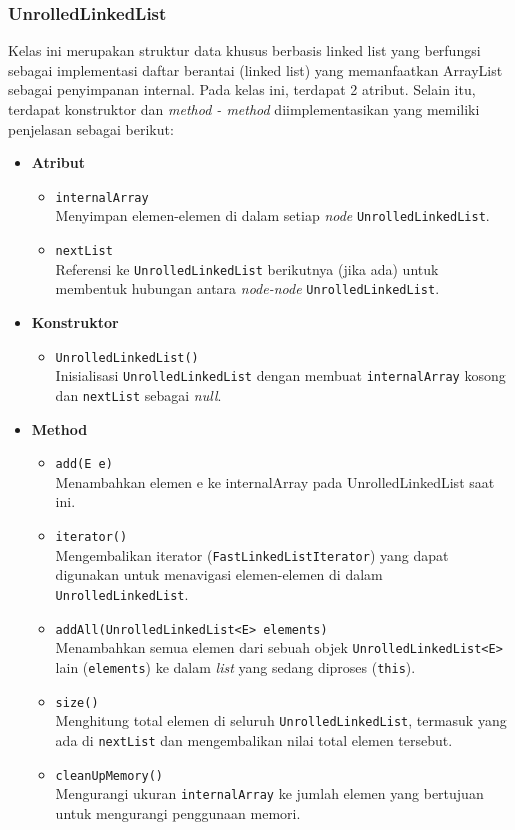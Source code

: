 \subsubsection{UnrolledLinkedList}
Kelas ini merupakan struktur data khusus berbasis linked list yang berfungsi sebagai implementasi daftar berantai (linked list) yang memanfaatkan ArrayList sebagai penyimpanan internal. Pada kelas ini, terdapat 2 atribut. Selain itu, terdapat konstruktor dan \textit{method - method} diimplementasikan yang memiliki penjelasan sebagai berikut:
\begin{itemize}
    \item \textbf{Atribut}
    \begin{itemize}
        \item \texttt{internalArray}
        \\ Menyimpan elemen-elemen di dalam setiap \textit{node} \texttt{UnrolledLinkedList}.
        \item \texttt{nextList}
        \\ Referensi ke \texttt{UnrolledLinkedList} berikutnya (jika ada) untuk membentuk hubungan antara \textit{node-node} \texttt{UnrolledLinkedList}.
    \end{itemize}

    \item \textbf{Konstruktor}
    \begin{itemize}
        \item \texttt{UnrolledLinkedList()}
        \\ Inisialisasi \texttt{UnrolledLinkedList} dengan membuat \texttt{internalArray} kosong dan \texttt{nextList} sebagai \textit{null}.
    \end{itemize}

    \item \textbf{Method}
    \begin{itemize}
        \item \texttt{add(E e)}
        \\Menambahkan elemen e ke internalArray pada UnrolledLinkedList saat ini.

        \item \texttt{iterator()}
        \\Mengembalikan iterator (\texttt{FastLinkedListIterator}) yang dapat digunakan untuk menavigasi elemen-elemen di dalam \texttt{UnrolledLinkedList}.
        \item \texttt{addAll(UnrolledLinkedList<E> elements)}
        \\ Menambahkan semua elemen dari sebuah objek \texttt{UnrolledLinkedList<E>} lain (\texttt{elements}) ke dalam \textit{list} yang sedang diproses (\texttt{this}).
        \item \texttt{size()}
        \\ Menghitung total elemen di seluruh \texttt{UnrolledLinkedList}, termasuk yang ada di \texttt{nextList} dan mengembalikan nilai total elemen tersebut.
        \item \texttt{cleanUpMemory()}
        \\Mengurangi ukuran \texttt{internalArray} ke jumlah elemen yang bertujuan untuk mengurangi penggunaan memori.
    \end{itemize}
\end{itemize}

